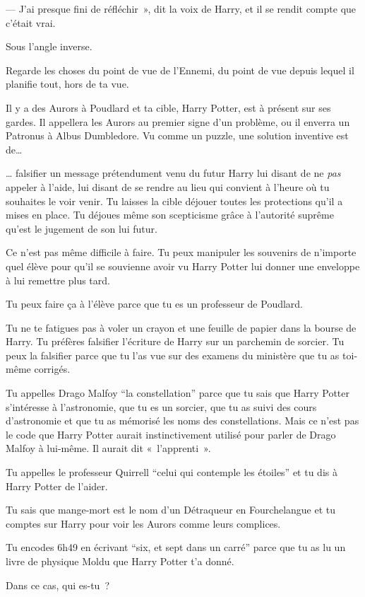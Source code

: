 --- J'ai presque fini de réfléchir~», dit la voix de Harry, et il se rendit compte que c'était vrai.

Sous l'angle inverse.

Regarde les choses du point de vue de l'Ennemi, du point de vue depuis lequel il planifie tout, hors de ta vue.

Il y a des Aurors à Poudlard et ta cible, Harry Potter, est à présent sur ses gardes. Il appellera les Aurors au premier signe d'un problème, ou il enverra un Patronus à Albus Dumbledore. Vu comme un puzzle, une solution inventive est de…

… falsifier un message prétendument venu du futur Harry lui disant de ne \emph{pas} appeler à l'aide, lui disant de se rendre au lieu qui convient à l'heure où tu souhaites le voir venir. Tu laisses la cible déjouer toutes les protections qu'il a mises en place. Tu déjoues même son scepticisme grâce à l'autorité suprême qu'est le jugement de son lui futur.

Ce n'est pas même difficile à faire. Tu peux manipuler les souvenirs de n'importe quel élève pour qu'il se souvienne avoir vu Harry Potter lui donner une enveloppe à lui remettre plus tard.

Tu peux faire ça à l'élève parce que tu es un professeur de Poudlard.

Tu ne te fatigues pas à voler un crayon et une feuille de papier dans la bourse de Harry. Tu préfères falsifier l'écriture de Harry sur un parchemin de sorcier. Tu peux la falsifier parce que tu l'as vue sur des examens du ministère que tu as toi-même corrigés.

Tu appelles Drago Malfoy “la constellation” parce que tu sais que Harry Potter s'intéresse à l'astronomie, que tu es un sorcier, que tu as suivi des cours d'astronomie et que tu as mémorisé les noms des constellations. Mais ce n'est pas le code que Harry Potter aurait instinctivement utilisé pour parler de Drago Malfoy à lui-même. Il aurait dit «~l'apprenti~».

Tu appelles le professeur Quirrell “celui qui contemple les étoiles” et tu dis à Harry Potter de l'aider.

Tu sais que mange-mort est le nom d'un Détraqueur en Fourchelangue et tu comptes sur Harry pour voir les Aurors comme leurs complices.

Tu encodes 6h49 en écrivant “six, et sept dans un carré” parce que tu as lu un livre de physique Moldu que Harry Potter t'a donné.

Dans ce cas, qui es-tu~?


